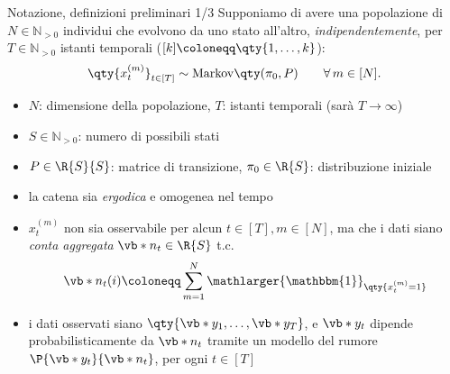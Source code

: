 \documentclass[10pt,xcolor={table,dvipsnames}]{beamer} 		%
\theoremstyle{plain}					%
\theoremstyle{definition}
\theoremstyle{remark}
\begin{document}
	\begin{frame}{Notazione, definizioni preliminari 1/3}%
		Supponiamo di avere una popolazione di $N\in\mathbb{N}_{>0}$ individui che evolvono da 
		uno stato all'altro, \emph{indipendentemente}, per $T\in\mathbb{N}_{>0}$ istanti temporali 
		{\smaller ($[k]\coloneqq\qty{1,\dots,k}$)}:
		\[
			\qty{x_{t}^{(m)}}_{t\in[T]}\sim\mathrm{Markov}\qty(\pi_0,P)\qquad\forall\,m\in[N].
		\]
		\vspace*{-\baselineskip}
		\begin{itemize}
			\item<2-> $N$: dimensione della popolazione, $T$: istanti temporali {\smaller(sarà $T\to\infty$)}
			\item<3-> $S\in\mathbb{N}_{>0}$: numero di possibili stati
			\item<4-> $P\in\R{S}{S}$: matrice di transizione, $\pi_0\in\R{S}$: distribuzione iniziale
		\end{itemize}
		\smallskip 
		
		\begin{itemize}
			\item<5-> la catena sia \emph{ergodica} e omogenea nel tempo
			\item<6-> $x_t^{(m)}$ non sia osservabile per alcun $t\in[T], m\in[N]$, 
			ma che i dati siano \emph{conta aggregata} $\vb*{n}_t\in\R{S}$ t.c.
			\vspace*{-\baselineskip}
			\[
				\vb*{n}_t(i)\coloneqq\sum_{m=1}^N\mathlarger{\mathbbm{1}}_{\qty{x_{t}^{(m)}=1}}
			\]
			\vspace*{-\baselineskip}
			\item<7-> i dati osservati siano $\qty{\vb*{y}_1,\dots,\vb*{y}_T}$, 
			e $\vb*{y}_t$ dipende probabilisticamente
			da $\vb*{n}_t$ tramite un modello del rumore $\P{\vb*{y}_t}{\vb*{n}_t}$, per ogni $t\in[T]$ 
		\end{itemize}

		
	\end{frame}
\end{document}
